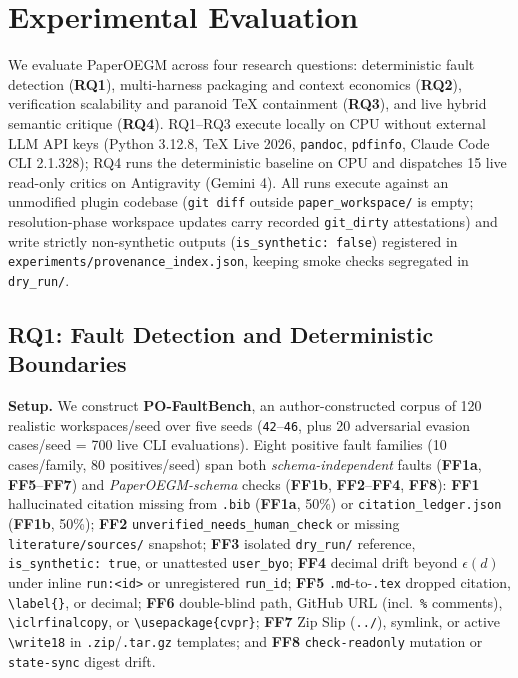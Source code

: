 \section{Experimental Evaluation}\label{sec:experiments}

We evaluate PaperOEGM across four research questions: deterministic fault detection (\textbf{RQ1}), multi-harness packaging and context economics (\textbf{RQ2}), verification scalability and paranoid TeX containment (\textbf{RQ3}), and live hybrid semantic critique (\textbf{RQ4}). RQ1--RQ3 execute locally on CPU without external LLM API keys (Python 3.12.8, TeX Live 2026, \texttt{pandoc}, \texttt{pdfinfo}, Claude Code CLI 2.1.328); RQ4 runs the deterministic baseline on CPU and dispatches 15 live read-only critics on Antigravity (Gemini 4). All runs execute against an unmodified plugin codebase (\texttt{git\ diff} outside \texttt{paper\_\allowbreak{}workspace/} is empty; resolution-phase workspace updates carry recorded \texttt{git\_\allowbreak{}dirty} attestations) and write strictly non-synthetic outputs (\texttt{is\_\allowbreak{}synthetic:\ false}) registered in \texttt{experiments/\allowbreak{}provenance\_\allowbreak{}index.\allowbreak{}json}, keeping smoke checks segregated in \texttt{dry\_\allowbreak{}run/}.

\subsection{RQ1: Fault Detection and Deterministic Boundaries}\label{sec:exp-rq1}

\textbf{Setup.} We construct \textbf{PO-FaultBench}, an author-constructed corpus of 120 realistic workspaces/seed over five seeds (\texttt{42}--\texttt{46}, plus 20 adversarial evasion cases/seed = 700 live CLI evaluations). Eight positive fault families (10 cases/family, 80 positives/seed) span both \emph{schema-independent} faults (\textbf{FF1a}, \textbf{FF5}--\textbf{FF7}) and \emph{PaperOEGM-schema} checks (\textbf{FF1b}, \textbf{FF2}--\textbf{FF4}, \textbf{FF8}): \textbf{FF1} hallucinated citation missing from \texttt{.bib} (\textbf{FF1a}, 50\%) or \texttt{citation\_\allowbreak{}ledger.\allowbreak{}json} (\textbf{FF1b}, 50\%); \textbf{FF2} \texttt{unverified\_\allowbreak{}needs\_\allowbreak{}human\_\allowbreak{}check} or missing \texttt{literature/\allowbreak{}sources/} snapshot; \textbf{FF3} isolated \texttt{dry\_\allowbreak{}run/} reference, \texttt{is\_\allowbreak{}synthetic:\ true}, or unattested \texttt{user\_\allowbreak{}byo}; \textbf{FF4} decimal drift beyond \(\epsilon(d)\) under inline \texttt{run:\textless{}id\textgreater{}} or unregistered \texttt{run\_\allowbreak{}id}; \textbf{FF5} \texttt{.md}-to-\texttt{.tex} dropped citation, \texttt{\textbackslash{}label\{\}}, or decimal; \textbf{FF6} double-blind path, GitHub URL (incl.~\texttt{\%} comments), \texttt{\textbackslash{}iclrfinalcopy}, or \texttt{\textbackslash{}usepackage\{cvpr\}}; \textbf{FF7} Zip Slip (\texttt{../}), symlink, or active \texttt{\textbackslash{}write18} in \texttt{.zip}/\allowbreak{}\texttt{.tar.\allowbreak{}gz} templates; and \textbf{FF8} \texttt{check-readonly} mutation or \texttt{state-sync} digest drift.


